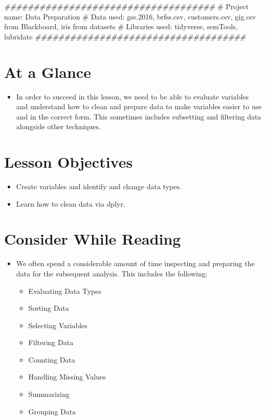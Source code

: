 \documentclass[
  letterpaper,
  DIV=11,
  numbers=noendperiod]{scrreprt}
\newenvironment{Shaded}{\begin{snugshade}}{\end{snugshade}}
\newcommand{\CommentTok}[1]{\textcolor[rgb]{0.37,0.37,0.37}{#1}}
\newcommand{\DocumentationTok}[1]{\textcolor[rgb]{0.37,0.37,0.37}{\textit{#1}}}
\providecommand{\tightlist}{%
  \setlength{\itemsep}{0pt}\setlength{\parskip}{0pt}}\usepackage{longtable,booktabs,array}
\begin{document}
\begin{Shaded}
\begin{Highlighting}[]
\DocumentationTok{\#\#\#\#\#\#\#\#\#\#\#\#\#\#\#\#\#\#\#\#\#\#\#\#\#\#\#\#\#\#\#\#\#\#\#\#}
\CommentTok{\# Project name: Data Preparation}
\CommentTok{\# Data used: gss.2016, brfss.csv, customers.csv, gig.csv from Blackboard, iris from datasets}
\CommentTok{\# Libraries used: tidyverse, semTools, lubridate}
\DocumentationTok{\#\#\#\#\#\#\#\#\#\#\#\#\#\#\#\#\#\#\#\#\#\#\#\#\#\#\#\#\#\#\#\#\#\#\#\#}
\end{Highlighting}
\end{Shaded}

\section{At a Glance}\label{at-a-glance-1}

\begin{itemize}
\tightlist
\item
  In order to succeed in this lesson, we need to be able to evaluate
  variables and understand how to clean and prepare data to make
  variables easier to use and in the correct form. This sometimes
  includes subsetting and filtering data alongside other techniques.
\end{itemize}

\section{Lesson Objectives}\label{lesson-objectives-2}

\begin{itemize}
\tightlist
\item
  Create variables and identify and change data types.
\item
  Learn how to clean data via dplyr.
\end{itemize}

\section{Consider While Reading}\label{consider-while-reading-2}

\begin{itemize}
\tightlist
\item
  We often spend a considerable amount of time inspecting and preparing
  the data for the subsequent analysis. This includes the following:

  \begin{itemize}
  \tightlist
  \item
    Evaluating Data Types
  \item
    Sorting Data
  \item
    Selecting Variables
  \item
    Filtering Data
  \item
    Counting Data
  \item
    Handling Missing Values
  \item
    Summarizing
  \item
    Grouping Data
  \end{itemize}
\end{itemize}
\end{document}
